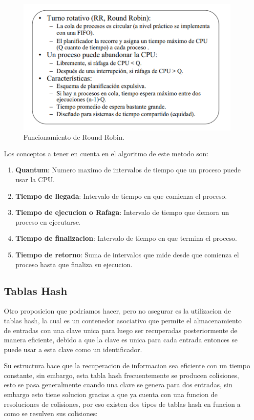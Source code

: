 \documentclass[conference,letterpaper]{IEEEtran}
\begin{document}
\begin{figure}[thpb]
      \centering
      \includegraphics[width=0.6\linewidth]{rr.png}
      \caption{Funcionamiento de Round Robin.}
      \label{fig:RR}
\end{figure}

Los conceptos a tener en cuenta en el algoritmo de este metodo son:
\begin{enumerate}
    \item \textbf{Quantum}: Numero maximo de intervalos de tiempo que un proceso puede usar la CPU.
    \item \textbf{Tiempo de llegada}: Intervalo de tiempo en que comienza el proceso.
    \item \textbf{Tiempo de ejecucion o Rafaga}: Intervalo de tiempo que demora un proceso en ejecutarse.
    \item \textbf{Tiempo de finalizacion}: Intervalo de tiempo en que termina el proceso.
    \item \textbf{Tiempo de retorno}: Suma de intervalos que mide desde que comienza el proceso hasta que finaliza su ejecucion.
\end{enumerate}

\subsection{Tablas Hash}
Otro proposicion que podriamos hacer, pero no asegurar es la utilizacion de tablas hash, la cual es un contenedor asociativo que permite el almacenamiento de entradas con una clave unica para luego ser recuperadas posteriormente de manera eficiente, debido a que la clave es unica para cada entrada entonces se puede usar a esta clave como un identificador.

Su estructura hace que la recuperacion de informacion sea eficiente con un tiempo constante, sin embargo, esta tabla hash frecuentemente se producen colisiones, esto se pasa generalmente cuando una clave se genera para dos entradas, sin embargo esto tiene solucion gracias a que ya cuenta con una funcion de resoluciones de colisiones, por eso existen dos tipos de tablas hash en funcion a como se resulven sus colisiones:
\end{document}
